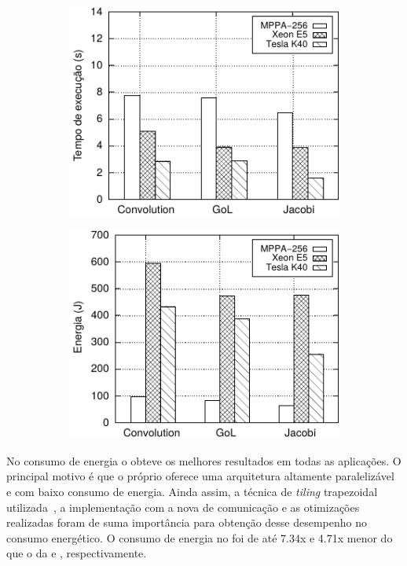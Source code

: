 \begin{figure}[H]
  \centering
  \caption{\mppa \async \textit{vs.} \cpu \textit{vs.} \gpu.}
  \begin{subfigure}{0.494\textwidth}
    \centering
    \includegraphics[width=1\textwidth]{figs/ComparisonTimeTiles10.pdf}
    \label{fig:compara-tempo-async-cpu-gpu}
  \end{subfigure}
  \begin{subfigure}{0.494\textwidth}
    \centering
    \includegraphics[width=1\textwidth]{figs/ComparisonEnergyTiles10.pdf}
    \label{fig:compara-energia-async-cpu-gpu}
  \end{subfigure}
  \label{fig:async_vs_cpu_gpu}
\end{figure}

No consumo de energia o \pskelmppa \async obteve os melhores resultados em todas as aplicações. O principal motivo é que o próprio \mppa oferece uma arquitetura altamente paralelizável e com baixo consumo de energia. Ainda assim, a técnica de \textit{tiling} trapezoidal utilizada~\cite{Podesta:TCC}, a implementação com a nova \api de comunicação \async e as otimizações realizadas foram de suma importância para obtenção desse desempenho no consumo energético. O consumo de energia no \mppa foi de até 7.34x e 4.71x menor do que o da \cpu e \gpu, respectivamente.
